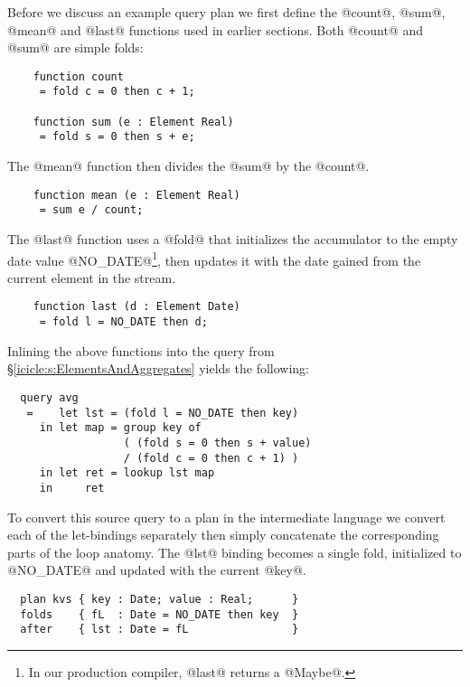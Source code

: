 Before we discuss an example query plan we first define the @count@, @sum@, @mean@ and @last@ functions used in earlier sections. Both @count@ and @sum@ are simple folds:
\begin{lstlisting}
    function count
     = fold c = 0 then c + 1;

    function sum (e : Element Real)
     = fold s = 0 then s + e;
\end{lstlisting}
The @mean@ function then divides the @sum@ by the @count@.
\begin{lstlisting}
    function mean (e : Element Real)
     = sum e / count;
\end{lstlisting}

The @last@ function uses a @fold@ that initializes the accumulator to the empty date value @NO_DATE@\footnote{In our production compiler, @last@ returns a @Maybe@.}, then updates it with the date gained from the current element in the stream.
\begin{lstlisting}
    function last (d : Element Date)
     = fold l = NO_DATE then d;
\end{lstlisting}


Inlining the above functions into the query from \S\ref{icicle:s:ElementsAndAggregates} yields the following:
\begin{lstlisting}
  query avg
   =    let lst = (fold l = NO_DATE then key)
     in let map = group key of
                  ( (fold s = 0 then s + value)
                  / (fold c = 0 then c + 1) )
     in let ret = lookup lst map
     in     ret
\end{lstlisting}

To convert this source query to a plan in the intermediate language we convert each of the let-bindings separately then simply concatenate the corresponding parts of the loop anatomy. The @lst@ binding becomes a single fold, initialized to @NO_DATE@ and updated with the current @key@.
\begin{lstlisting}
  plan kvs { key : Date; value : Real;      }
  folds    { fL  : Date = NO_DATE then key  }
  after    { lst : Date = fL                }
\end{lstlisting}


